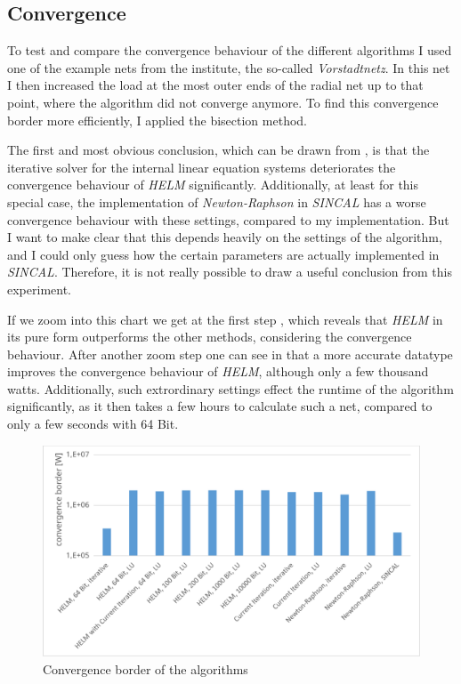 \subsection{Convergence}

To test and compare the convergence behaviour of the different algorithms I used one of the example nets from the institute, the so-called \emph{Vorstadtnetz}. In this net I then increased the load at the most outer ends of the radial net up to that point, where the algorithm did not converge anymore. To find this convergence border more efficiently, I applied the bisection method.

The first and most obvious conclusion, which can be drawn from , is that the iterative solver for the internal linear equation systems deteriorates the convergence behaviour of \emph{HELM} significantly. Additionally, at least for this special case, the implementation of \emph{Newton-Raphson} in \emph{SINCAL} has a worse convergence behaviour with these settings, compared to my implementation. But I want to make clear that this depends heavily on the settings of the algorithm, and I could only guess how the certain parameters are actually implemented in \emph{SINCAL}. Therefore, it is not really possible to draw a useful conclusion from this experiment.

If we zoom into this chart we get at the first step , which reveals that \emph{HELM} in its pure form outperforms the other methods, considering the convergence behaviour. After another zoom step one can see in  that a more accurate datatype improves the convergence behaviour of \emph{HELM}, although only a few thousand watts. Additionally, such extrordinary settings effect the runtime of the algorithm significantly, as it then takes a few hours to calculate such a net, compared to only a few seconds with 64 Bit.

\begin{figure}
	\centering
	\includegraphics[scale=0.7]{figures/convergence_border_vorstadtnetz_1}
	\caption[Comparison, convergence]{Convergence border of the algorithms}
	\label{fig:comparison_convergence_border_1}
\end{figure}

